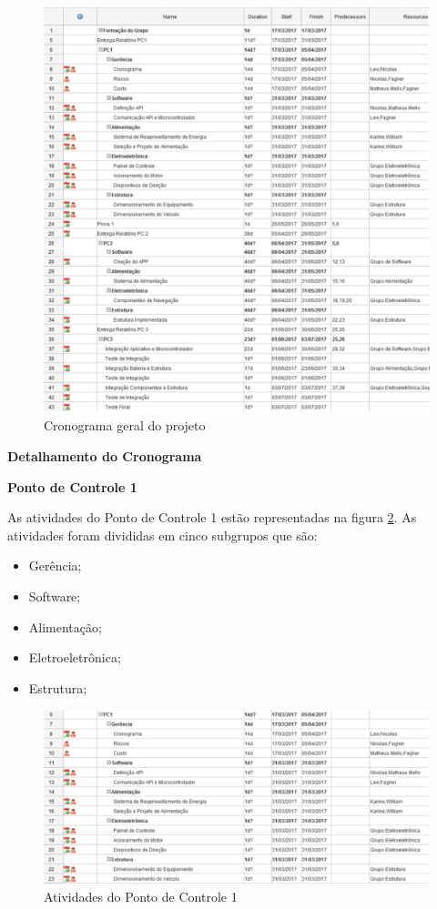 	\graphicspath{{figuras/}}
	\begin{figure}[h!]
	\centering
	\includegraphics[scale=0.80]{cronograma_geral}
	\caption{Cronograma geral do projeto}
	\label{img:cronograma_geral}
	\end{figure}
	
	\newpage
	
	\textbf{Detalhamento do Cronograma}
	
		\textbf{Ponto de Controle 1}
		
		As atividades do Ponto de Controle 1 estão representadas na figura \ref{img:PC1}. As atividades foram divididas em cinco subgrupos que são:
		
		\begin{itemize}
			\item Gerência;
			\item Software;
			\item Alimentação;
			\item Eletroeletrônica;
			\item Estrutura;
		\end{itemize}	
		
		\graphicspath{{figuras/}}
		\begin{figure}[h!]
			\centering
			\includegraphics[scale=0.60]{PC1}
			\caption{Atividades do Ponto de Controle 1}
			\label{img:PC1}
		\end{figure}	
		
